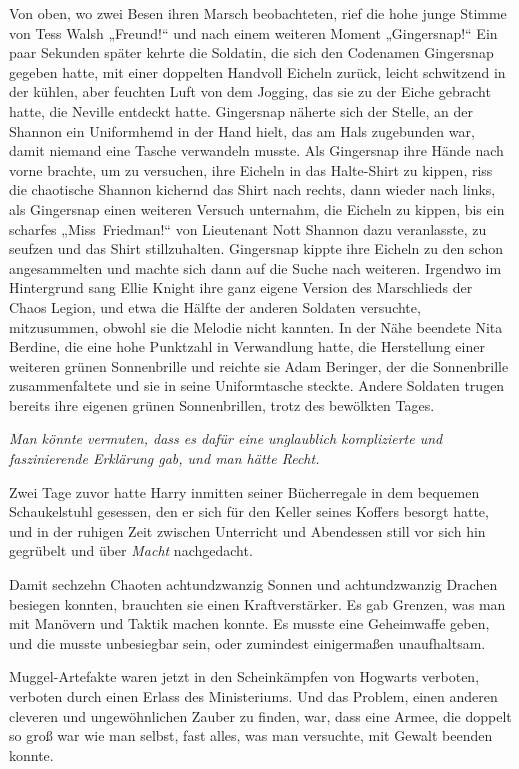 {Von oben, wo zwei Besen ihren Marsch beobachteten, rief die hohe junge Stimme von Tess Walsh „Freund!“ und nach einem weiteren Moment „Gingersnap!“ Ein paar Sekunden später kehrte die Soldatin, die sich den Codenamen Gingersnap gegeben hatte, mit einer doppelten Handvoll Eicheln zurück, leicht schwitzend in der kühlen, aber feuchten Luft von dem Jogging, das sie zu der Eiche gebracht hatte, die Neville entdeckt hatte. Gingersnap näherte sich der Stelle, an der Shannon ein Uniformhemd in der Hand hielt, das am Hals zugebunden war, damit niemand eine Tasche verwandeln musste. Als Gingersnap ihre Hände nach vorne brachte, um zu versuchen, ihre Eicheln in das Halte-Shirt zu kippen, riss die chaotische Shannon kichernd das Shirt nach rechts, dann wieder nach links, als Gingersnap einen weiteren Versuch unternahm, die Eicheln zu kippen, bis ein scharfes „Miss~Friedman!“ von Lieutenant Nott Shannon dazu veranlasste, zu seufzen und das Shirt stillzuhalten. Gingersnap kippte ihre Eicheln zu den schon angesammelten und machte sich dann auf die Suche nach weiteren. Irgendwo im Hintergrund sang Ellie Knight ihre ganz eigene Version des Marschlieds der Chaos Legion, und etwa die Hälfte der anderen Soldaten versuchte, mitzusummen, obwohl sie die Melodie nicht kannten. In der Nähe beendete Nita Berdine, die eine hohe Punktzahl in Verwandlung hatte, die Herstellung einer weiteren grünen Sonnenbrille und reichte sie Adam Beringer, der die Sonnenbrille zusammenfaltete und sie in seine Uniformtasche steckte. Andere Soldaten trugen bereits ihre eigenen grünen Sonnenbrillen, trotz des bewölkten Tages.

\emph{Man könnte vermuten, dass es dafür eine unglaublich komplizierte und faszinierende Erklärung gab, und man hätte Recht.}

Zwei Tage zuvor hatte Harry inmitten seiner Bücherregale in dem bequemen Schaukelstuhl gesessen, den er sich für den Keller seines Koffers besorgt hatte, und in der ruhigen Zeit zwischen Unterricht und Abendessen still vor sich hin gegrübelt und über \emph{Macht} nachgedacht.

Damit sechzehn Chaoten achtundzwanzig Sonnen und achtundzwanzig Drachen besiegen konnten, brauchten sie einen Kraftverstärker. Es gab Grenzen, was man mit Manövern und Taktik machen konnte. Es musste eine Geheimwaffe geben, und die musste unbesiegbar sein, oder zumindest einigermaßen unaufhaltsam.

Muggel-Artefakte waren jetzt in den Scheinkämpfen von Hogwarts verboten, verboten durch einen Erlass des Ministeriums. Und das Problem, einen anderen cleveren und ungewöhnlichen Zauber zu finden, war, dass eine Armee, die doppelt so groß war wie man selbst, fast alles, was man versuchte, mit Gewalt beenden konnte.

}

